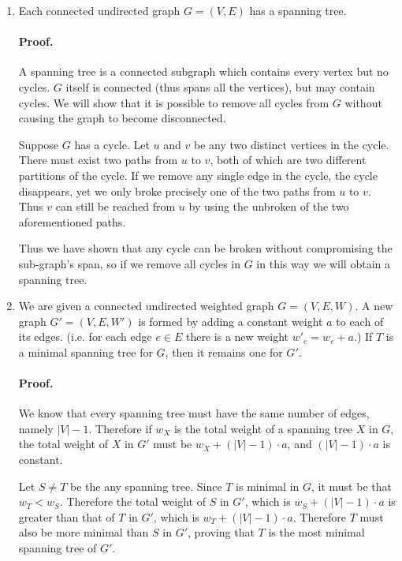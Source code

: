 \documentclass{article}
\begin{document}
\begin{enumerate}
	\item
		Each connected undirected graph \(G=(V,E)\) has a spanning tree.

		\paragraph{Proof.} A spanning tree is a connected subgraph which contains every vertex but no cycles. \(G\) itself is connected (thus spans all the vertices), but may contain cycles. We will show that it is possible to remove all cycles from \(G\) without causing the graph to become disconnected.

		Suppose \(G\) has a cycle. Let \(u\) and \(v\) be any two distinct vertices in the cycle. There must exist two paths from \(u\) to \(v\), both of which are two different partitions of the cycle. If we remove any single edge in the cycle, the cycle disappears, yet we only broke precisely one of the two paths from \(u\) to \(v\). Thus \(v\) can still be reached from \(u\) by using the unbroken of the two aforementioned paths.

		Thus we have shown that any cycle can be broken without compromising the sub-graph's span, so if we remove all cycles in \(G\) in this way we will obtain a spanning tree.

	\item
		We are given a connected undirected weighted graph \(G=(V,E,W)\). A new graph \(G' = (V, E, W')\) is formed by adding a constant weight \(a\) to each of its edges. (i.e. for each edge \(e \in E\) there is a new weight \(w'_e = w_e + a\).) If \(T\) is a minimal spanning tree for \(G\), then it remains one for \(G'\).

		\paragraph{Proof.} We know that every spanning tree must have the same number of edges, namely \(|V| - 1\). Therefore if \(w_X\) is the total weight of a spanning tree \(X\) in \(G\), the total weight of \(X\) in \(G'\) must be \(w_X + (|V| - 1) \cdot a\), and \((|V| - 1) \cdot a\) is constant.

		Let \(S \neq T\) be the any spanning tree. Since \(T\) is minimal in \(G\), it must be that \(w_T < w_S\). Therefore the total weight of \(S\) in \(G'\), which is \(w_S + (|V| - 1) \cdot a\) is greater than that of \(T\) in \(G'\), which is \(w_T + (|V| - 1) \cdot a\). Therefore \(T\) must also be more minimal than \(S\) in \(G'\), proving that \(T\) is the most minimal spanning tree of \(G'\).


\end{enumerate}
\end{document}
